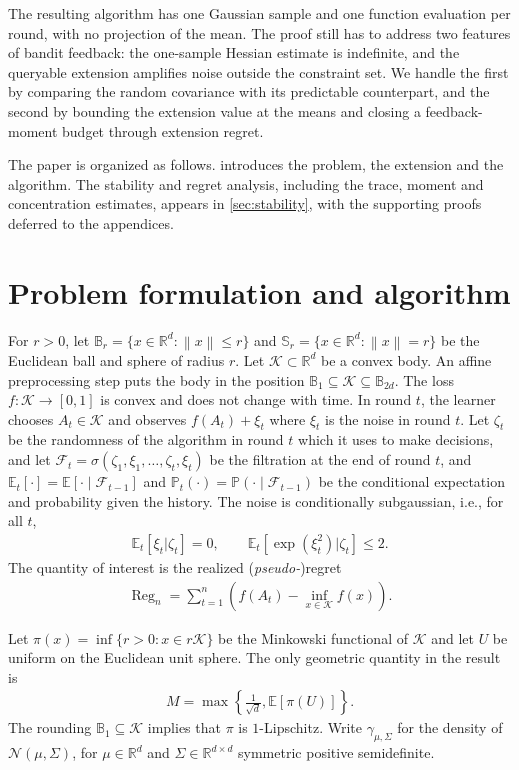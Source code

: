 \documentclass{article}
\newcommand{\R}{\mathbb R}
\newcommand{\E}{\mathbb E}
\newcommand{\Pp}{\mathbb P}
\newcommand{\K}{\mathcal K}
\newcommand{\F}{\mathcal F}
\newcommand{\N}{\mathcal N}
\newcommand{\1}{\mathbf 1}
\newcommand{\norm}[1]{\left\lVert #1\right\rVert}
\begin{document}
The resulting algorithm has one Gaussian sample and one function evaluation
per round, with no projection of the mean.
The proof still has to address two features of bandit feedback:
the one-sample Hessian estimate is indefinite, and the queryable extension
amplifies noise outside the constraint set.
We handle the first by comparing the random covariance with its
predictable counterpart, and the second by bounding the extension value at the means and closing
a feedback-moment budget through extension regret.

The paper is organized as follows.   introduces the problem,
the extension and the algorithm.
The stability and regret analysis, including the trace, moment and
concentration estimates, appears in \cref{sec:stability}, with the
supporting proofs deferred to the appendices.

\section{Problem formulation and algorithm}
\label{sec:setting}

For $r>0$, let $\mathbb{B}_r=\{x\in\R^d:\norm{x}\leq r\}$
and $\mathbb{S}_r=\{x\in\R^d:\norm{x}=r\}$ be the Euclidean ball and sphere of radius $r$.
Let $\K\subset\R^d$ be a convex body.  An affine preprocessing step puts the body
in the position $\mathbb{B}_1\subseteq\K\subseteq \mathbb{B}_{2d}$.
The loss $f:\K\to[0,1]$ is convex and does not change with time.  In round
$t$, the learner chooses $A_t\in\K$ and observes $f(A_t)+\xi_t$
where $\xi_t$ is the noise in round $t$.
Let $\zeta_t$ be the randomness of the algorithm in round $t$ which it uses to make decisions, and let
$\F_t=\sigma(\zeta_1,\xi_1,\ldots,\zeta_t,\xi_t)$ be the filtration at the end of round $t$,
and $\E_t[\cdot]=\E[\cdot\mid\F_{t-1}]$ and $\Pp_t(\cdot)=\Pp(\cdot\mid\F_{t-1})$ be the conditional expectation and probability given the history.
The noise is conditionally subgaussian, i.e., for all $t$,
\begin{align}
    \E_t[\xi_t|\zeta_t]=0,
    \qquad
    \E_t[\exp(\xi_t^2)|\zeta_t]\leq2.
    \label{eq:noise}
\end{align}
The quantity of interest is the realized (\textit{pseudo-})regret
\begin{align}
    \operatorname{Reg}_n
    =\sum_{t=1}^n\left(f(A_t)-\inf_{x\in\K}f(x)\right).
    \label{eq:regret}
\end{align}

Let $\pi(x)=\inf\{r>0:x\in r\K\}$ be the Minkowski functional of $\K$ and let
$U$ be uniform on the Euclidean unit sphere.
The only geometric quantity in the result is
\begin{align}
    M=\max\left\{\frac1{\sqrt d},\E[\pi(U)]\right\}.
    \label{eq:M}
\end{align}
The rounding  $\mathbb{B}_1\subseteq\K$ implies that $\pi$ is $1$-Lipschitz.
Write $\gamma_{\mu,\Sigma}$ for the density of
$\N(\mu,\Sigma)$, for $\mu\in\R^d$ and $\Sigma\in\R^{d\times d}$ symmetric positive semidefinite.
\end{document}
